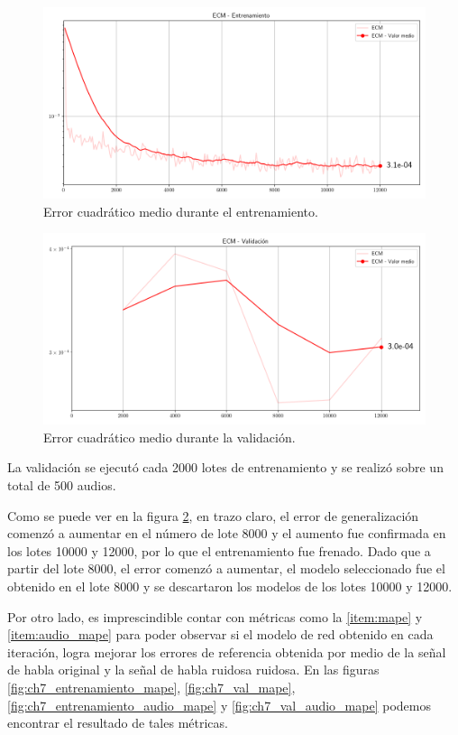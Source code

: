 \begin{figure}
	\centering
	\centerline{\includegraphics[scale=0.65]{images/ch7/entrenamiento/train_mse.png}}
	\caption{Error cuadrático medio durante el entrenamiento.}
	\label{fig:ch7_entrenamiento_mse}
\end{figure}

\begin{figure}
	\centering
	\centerline{\includegraphics[scale=0.65]{images/ch7/entrenamiento/val_mse.png}}
	\caption{Error cuadrático medio durante la validación.}
	\label{fig:ch7_validacion_mse}
\end{figure}

La validación se ejecutó cada 2000 lotes de entrenamiento y se realizó sobre un total de 500 audios.

Como se puede ver en la figura \ref{fig:ch7_validacion_mse}, en trazo claro, el error de generalización comenzó a aumentar en el número de lote 8000 y el aumento fue confirmada en los lotes 10000 y 12000, por lo que el entrenamiento fue frenado. Dado que a partir del lote 8000, el error comenzó a aumentar, el modelo seleccionado fue el obtenido en el lote 8000 y se descartaron los modelos de los lotes 10000 y 12000.

Por otro lado, es imprescindible contar con métricas como la \ref{item:mape} y \ref{item:audio_mape} para poder observar si el modelo de red obtenido en cada iteración, logra mejorar los errores de referencia obtenida por medio de la señal de habla original y la señal de habla ruidosa ruidosa. En las figuras \ref{fig:ch7_entrenamiento_mape}, \ref{fig:ch7_val_mape}, \ref{fig:ch7_entrenamiento_audio_mape} y \ref{fig:ch7_val_audio_mape} podemos encontrar el resultado de tales métricas.

